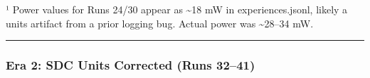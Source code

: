 \begin{record}
\begin{landscape}
\end{landscape}

¹ Power values for Runs 24/30 appear as \textasciitilde18 mW in
experiences.jsonl, likely a units artifact from a prior logging bug.
Actual power was \textasciitilde28--34 mW.

\begin{center}\rule{0.5\linewidth}{0.5pt}\end{center}

\end{record}

\subsubsection{Era 2: SDC Units Corrected (Runs 32--41)}\label{cr:run:asap7-cpu:era-2-sdc-units-corrected-runs-3241}


